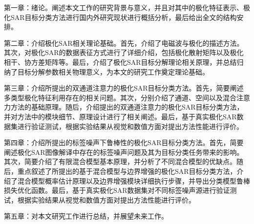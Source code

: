 第一章：绪论。阐述本文工作的研究背景与意义，并且对其中的极化特征表示、极化SAR目标分类方法进行国内外研究现状进行概括分析，最后给出全文的结构安排。

第二章：介绍极化SAR相关理论基础。首先，介绍了电磁波与极化的描述方法。其次，对极化SAR的数据表征方式进行了详细介绍，包括极化散射矩阵以及极化相干、协方差矩阵等。最后，介绍了极化SAR目标分解理论相关原理，并总结归纳了目标分解参数相关物理意义，为本文的研究工作奠定理论基础。

第三章：介绍所提出的双通道注意力的极化SAR目标分类方法。首先，简要阐述多类型极化特征利用存在的相关问题。其次，分别介绍了通道、空间以及混合注意力方法的基础原理。随后，介绍提出的双通道注意力的极化SAR目标分类方法，并对方法中的模块细节、原理设计进行了相关阐述。最后，基于真实极化SAR数据集进行验证测试，根据实验结果从视觉和数值方面对提出方法性能进行评价。


第四章：介绍所提出的标签噪声下鲁棒性的极化SAR目标分类方法。首先，简要阐述极化SAR图像解译中存在的标签噪声问题及其为目标分类任务带来的影响。其次，简要介绍了有限混合模型基本原理，并分析了不同混合模型的优缺点。随后，重点叙述了所提出的基于混合模型与边界增强的极化SAR目标分类方法，介绍了混合模型概率估计原理以及边界增强模块详细执行步骤，并导出分类模型鲁棒损失优化函数。最后，基于真实极化SAR数据集对不同标签噪声源进行验证测试，根据实验结果从视觉和数值方面对提出方法性能进行评价。



第五章：对本文研究工作进行总结，并展望未来工作。